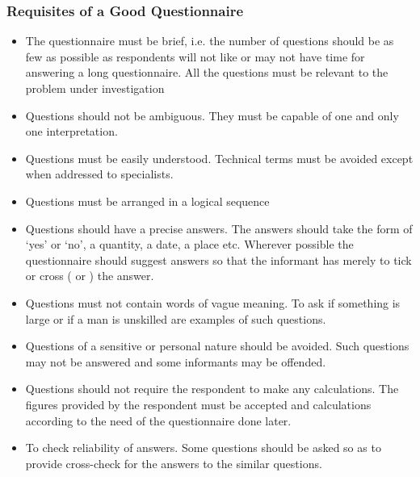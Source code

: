 \documentclass[
10pt, %
a4paper, %
]{report}
\begin{document}
\subsubsection*{Requisites of a Good Questionnaire}
\begin{itemize}
\item The questionnaire must be brief, i.e. the number of questions
should be as few as possible as respondents will not like or may not have time for answering a long questionnaire. All the questions must be relevant to the problem under investigation
\item Questions should not be ambiguous. They must be capable of
one and only one interpretation.
\item Questions must be easily understood. Technical terms
must be avoided except when addressed to specialists.
\item Questions must be arranged in a logical sequence
\item Questions should have a precise answers. The answers should take the form of ‘yes’ or ‘no’, a quantity, a date, a place etc. Wherever possible the questionnaire should suggest answers so that the informant has merely to tick or cross ( or ) the answer.
\item Questions must not contain words of vague meaning. To ask if something is large or if a man is unskilled are examples of such questions.
\item Questions of a sensitive or personal nature should be avoided. Such questions may not be answered and some informants may be offended.
\item Questions should not require the respondent to make any
calculations. The figures provided by the respondent must
be accepted and calculations according to the need of the
questionnaire done later.
\item To check reliability of answers. Some questions should be
asked so as to provide cross-check for the answers to the
similar questions.
\end{itemize}
\end{document}
